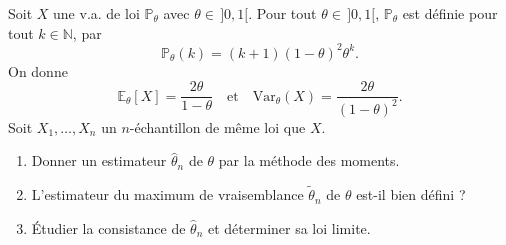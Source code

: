 \smallskip

\begin{mdframed}
\begin{exercice}
Soit $X$ une v.a. de loi $\mathbb{P}_\theta$ avec $\theta \in \, ]0, 1[$. Pour tout $\theta \in \, ]0, 1[$, $\mathbb{P}_\theta$ est définie pour tout $k \in \mathbb{N}$, par
\begin{equation*}
\mathbb{P}_\theta(k) = (k + 1)(1 - \theta)^2 \theta^k.
\end{equation*}
On donne
\begin{equation*}
\mathbb{E}_\theta[X] = \frac{2\theta}{1-\theta} \quad \text{et} \quad \text{Var}_\theta(X) = \frac{2\theta}{(1 - \theta)^2}.
\end{equation*}
Soit $X_1, \dots, X_n$ un $n$-échantillon de même loi que $X$.
\begin{enumerate}
    \item Donner un estimateur $\hat{\theta}_n$ de $\theta$ par la méthode des moments.
    \item L'estimateur du maximum de vraisemblance $\tilde{\theta}_n$ de $\theta$ est-il bien défini ?
    \item Étudier la consistance de $\hat{\theta}_n$ et déterminer sa loi limite.
\end{enumerate}
\end{exercice}
\end{mdframed}

\smallskip

